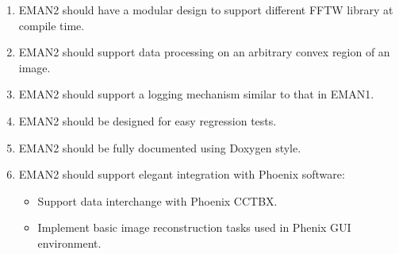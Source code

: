 \begin{enumerate}
    \item
      EMAN2 should have a modular design to support different FFTW
      library at compile time.

    \item
      EMAN2 should support data processing on an arbitrary convex
      region of an image.
 
    \item
      EMAN2 should support a logging mechanism similar to that in EMAN1.

    \item
      EMAN2 should be designed for easy regression tests.

    \item
      EMAN2 should be fully documented using Doxygen style.

    \item
      EMAN2 should support elegant integration with Phoenix software:

      \begin{itemize}
	\item
	  Support data interchange with Phoenix CCTBX.
	\item
	  Implement basic image reconstruction tasks used in Phenix
	  GUI environment. 
      \end{itemize}
 
\end{enumerate}

%